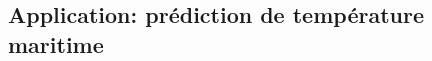 \documentclass[xcolor=svgnames, t]{beamer}
\newcommand{\matrixx}[1]{\boldsymbol{\MakeUppercase{#1}}}
\newcommand{\coloredemph}[1]{\textcolor{internationalblue}{\emph{#1}}}
\begin{document}

\subsection{Application: prédiction de température maritime}
\end{document}
